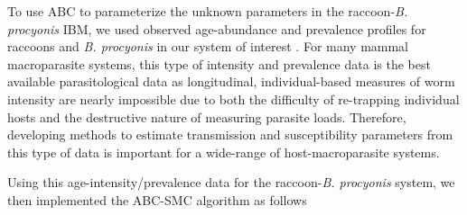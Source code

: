 \documentclass[11pt]{article}
\begin{document}
To use ABC to parameterize the unknown parameters in the
raccoon-\emph{B. procyonis} IBM, we used observed age-abundance and
prevalence profiles for raccoons and \emph{B. procyonis} in our system
of interest \citep{Weinstein2016}. For many mammal macroparasite
systems, this type of intensity and prevalence data is the best
available parasitological data as longitudinal, individual-based
measures of worm intensity are nearly impossible due to both the
difficulty of re-trapping individual hosts and the destructive nature of
measuring parasite loads.
Therefore, developing methods to estimate transmission and
susceptibility parameters from this type of data is important for a
wide-range of host-macroparasite systems.

Using this age-intensity/prevalence data for the raccoon-\emph{B.
procyonis} system, we then implemented the ABC-SMC algorithm as follows \citep{Sisson2009,Toni2009}
\end{document}
